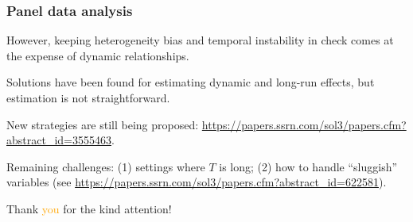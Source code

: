 \documentclass[11pt,english,dvipsnames,aspectratio=169,handout]{beamer}\usepackage[]{graphicx}\usepackage[]{xcolor}
\begin{document}
\begin{frame}
  \frametitle{Panel data analysis}
  However, keeping heterogeneity bias and temporal instability in check comes at the expense of dynamic relationships.\bigskip
  \pause
  
  Solutions have been found for estimating dynamic and long-run effects, but estimation is not straightforward.\bigskip
  \pause
  
  New strategies are still being proposed: \url{https://papers.ssrn.com/sol3/papers.cfm?abstract_id=3555463}.\bigskip
  \pause

	Remaining challenges: (1) settings where $T$ is long; (2) how to handle ``sluggish'' variables (see \url{https://papers.ssrn.com/sol3/papers.cfm?abstract_id=622581}).

\end{frame}


\begin{frame}
\begin{center}
    \Huge Thank \textcolor{orange}{you} for the kind attention!
\end{center}
\end{frame}


\begin{frame}

\scriptsize
\end{frame}
\end{document}
